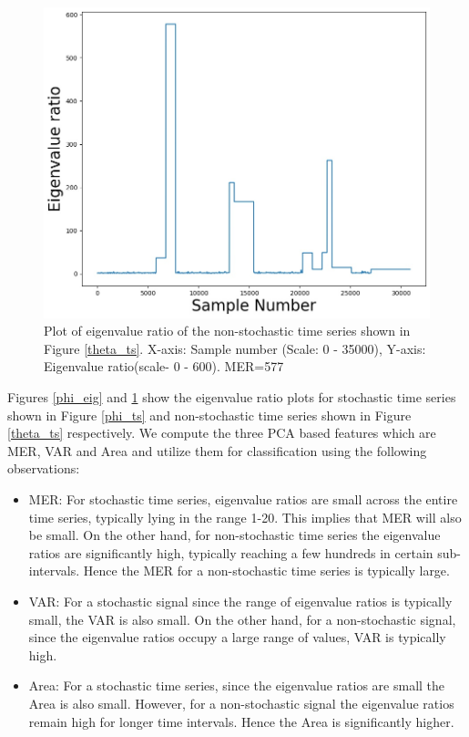 \documentclass[10pt,conference]{IEEEtran}
\begin{document}
\begin{figure}[ht]
\centering
\includegraphics[width=1\linewidth]{sac_ascf_theta_eig.jpg}
\caption{Plot of eigenvalue ratio of the  non-stochastic time series shown in Figure \ref{theta_ts}. X-axis: Sample number (Scale: 0 - 35000), Y-axis: Eigenvalue ratio(scale- 0 - 600). MER=577 }
\label{theta_eig}
\end{figure}

Figures \ref{phi_eig} and \ref{theta_eig} show the eigenvalue ratio plots for stochastic time series shown in Figure \ref{phi_ts} and  non-stochastic time series shown in Figure \ref{theta_ts} respectively. We compute the three PCA based features which are MER, VAR and Area  and utilize them for classification using the following observations:

\begin{itemize}
\item MER: For stochastic time series, eigenvalue ratios  are small across the entire time series, typically lying in the range 1-20. This implies that MER  will also be small. On the other hand, for  non-stochastic time series the eigenvalue ratios are significantly high, typically reaching a few hundreds in certain sub-intervals. Hence the MER for a non-stochastic time series is typically large.
\item VAR: For a stochastic signal since the range of eigenvalue ratios is typically small, the VAR is also small. On the other hand, for a non-stochastic signal, since the eigenvalue ratios occupy a large range of values, VAR is typically high.
\item Area: For a stochastic time series, since the eigenvalue ratios  are small the Area is also small. However, for a non-stochastic signal the eigenvalue ratios remain high for longer time intervals. Hence the Area is significantly higher.
\end{itemize}
\end{document}
